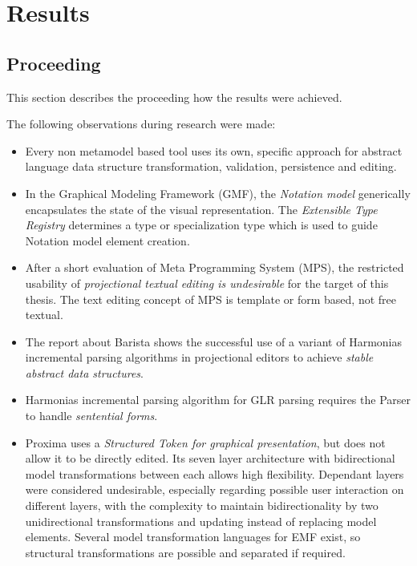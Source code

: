 \chapter{Results}


\section{Proceeding} 
This section describes the proceeding how the results were achieved.

The following observations during research were made:
\begin{itemize}
	\item Every non metamodel based tool uses its own, specific approach for abstract language data structure transformation, validation, persistence and editing.
	\item In the Graphical Modeling Framework (GMF), the \emph{Notation model} generically encapsulates the state of the visual representation. The \emph{Extensible Type Registry} determines a type or specialization type which is used to guide Notation model element creation. 
	\item After a short evaluation of Meta Programming System (MPS), the restricted usability of \emph{projectional textual editing is undesirable} for the target of this thesis. The text editing concept of MPS is template or form based, not free textual.
	\item The report \cite{Barista} about Barista shows the successful use of a variant of Harmonias incremental parsing algorithms in projectional editors to achieve \emph{stable abstract data structures}.
	\item Harmonias incremental parsing algorithm for GLR parsing requires the Parser to handle \emph{sentential forms}.
	\item Proxima uses a \emph{Structured Token for graphical presentation}, but does not allow it to be directly edited.  Its seven layer architecture with bidirectional model transformations between each allows high flexibility. Dependant layers were considered undesirable, especially regarding possible user interaction on different layers, with the complexity to maintain bidirectionality by two unidirectional transformations and updating instead of replacing model elements. Several model transformation languages for EMF exist, so structural transformations are possible and separated if required. 
\end{itemize}


